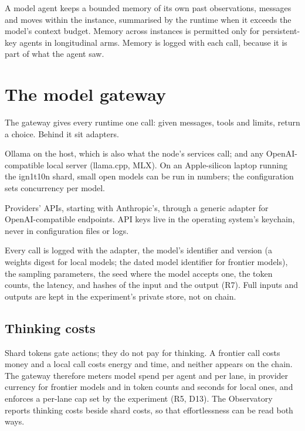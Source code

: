 \documentclass[11pt,a4paper]{article}
\begin{document}
A model agent keeps a bounded memory of its own past observations, messages and moves within the
instance, summarised by the runtime when it exceeds the model's context budget. Memory across
instances is permitted only for persistent-key agents in longitudinal arms. Memory is logged with
each call, because it is part of what the agent saw.

\section{The model gateway}\label{sec:gateway}

The gateway gives every runtime one call: given messages, tools and limits, return a choice. Behind
it sit adapters.

\begin{description}[leftmargin=1.2em,itemsep=3pt,font=\normalfont\spartansemi]
\item[Local.] Ollama on the host, which is also what the node's  services call;
  and any OpenAI-compatible local server (llama.cpp, MLX). On an Apple-silicon laptop running the
  ign1t10n shard, small open models can be run in numbers; the configuration sets concurrency per
  model.
\item[Frontier.] Providers' APIs, starting with Anthropic's, through a generic adapter for
  OpenAI-compatible endpoints. API keys live in the operating system's keychain, never in
  configuration files or logs.
\end{description}

Every call is logged with the adapter, the model's identifier and version (a weights digest for
local models; the dated model identifier for frontier models), the sampling parameters, the seed
where the model accepts one, the token counts, the latency, and hashes of the input and the output
(R7). Full inputs and outputs are kept in the experiment's private store, not on chain.

\subsection{Thinking costs}

Shard tokens gate actions; they do not pay for thinking. A frontier call costs money and a local
call costs energy and time, and neither appears on the chain. The gateway therefore meters model
spend per agent and per lane, in provider currency for frontier models and in token counts and
seconds for local ones, and enforces a per-lane cap set by the experiment (R5, D13). The
Observatory reports thinking costs beside shard costs, so that effortlessness can be read both ways.
\end{document}
